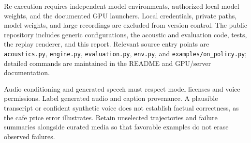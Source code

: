 \documentclass{article}
\newcommand{\code}[1]{\texttt{#1}}
\begin{document}
Re-execution requires independent model environments, authorized local model weights, and the documented GPU launchers. Local credentials, private paths, model weights, and large recordings are excluded from version control. The public repository includes generic configurations, the acoustic and evaluation code, tests, the replay renderer, and this report. Relevant source entry points are \code{acoustics.py}, \code{engine.py}, \code{evaluation.py}, \code{env.py}, and \code{examples/on\_policy.py}; detailed commands are maintained in the README and GPU/server documentation.

Audio conditioning and generated speech must respect model licenses and voice permissions. Label generated audio and caption provenance. A plausible transcript or confident synthetic voice does not establish factual correctness, as the cafe price error illustrates. Retain unselected trajectories and failure summaries alongside curated media so that favorable examples do not erase observed failures.



\end{document}

